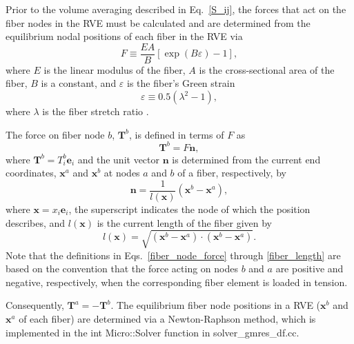 Prior to the volume averaging described in Eq.\ \eqref{S_ij}, the forces that act on the fiber nodes in the RVE must be calculated and are determined from the equilibrium nodal positions of each fiber in the RVE via 
%
\begin{equation}
F \equiv \frac{E A}{B}[\exp(B \varepsilon) - 1],
\label{fiber_force}
\end{equation}
%
where $E$ is the linear modulus of the fiber, $A$ is the cross-sectional area of the fiber, $B$ is a constant, and $\varepsilon$ is the fiber's Green strain
%
\begin{equation}
\varepsilon \equiv 0.5 \left(\lambda^2-1\right),
\label{Green_strain}
\end{equation}
% 
where $\lambda$ is the fiber stretch ratio \cite{Chandran:2007hy}. 

The force on fiber node $b$, $\textbf{T}^b$, is defined in terms of $F$ as
%
\begin{equation}
\textbf{T}^b = F \textbf{n},
\label{fiber_node_force}
\end{equation}
%
where $\textbf{T}^b = T^b_i \textbf{e}_i$ and the unit vector $\textbf{n}$ is determined from the current end coordinates, $\textbf{x}^a$ and $\textbf{x}^b$ at nodes $a$ and $b$ of a fiber, respectively, by
%
\begin{equation}
\textbf{n} = \frac{1}{l(\textbf{x})}(\textbf{x}^b - \textbf{x}^a),
\end{equation}
%
where $\textbf{x} = x_i \textbf{e}_i$, the superscript indicates the node of which the position describes, and $l(\textbf{x})$ is the current length of the fiber given by
%
\begin{equation}
l(\textbf{x}) = \sqrt{(\textbf{x}^b - \textbf{x}^a) \cdot (\textbf{x}^b - \textbf{x}^a)}.
\label{fiber_length}
\end{equation}
%
Note that the definitions in Eqs.\ \eqref{fiber_node_force} through \eqref{fiber_length} are based on the convention that the force acting on nodes $b$ and $a$ are positive and negative, respectively, when the corresponding fiber element is loaded in tension.

Consequently, $\textbf{T}^a = - \textbf{T}^b$. The equilibrium fiber node positions in a RVE ($\textbf{x}^b$ and $\textbf{x}^a$ of each fiber) are determined via a Newton-Raphson method, which is implemented in the int Micro::Solver function in solver\_gmres\_df.cc.  

